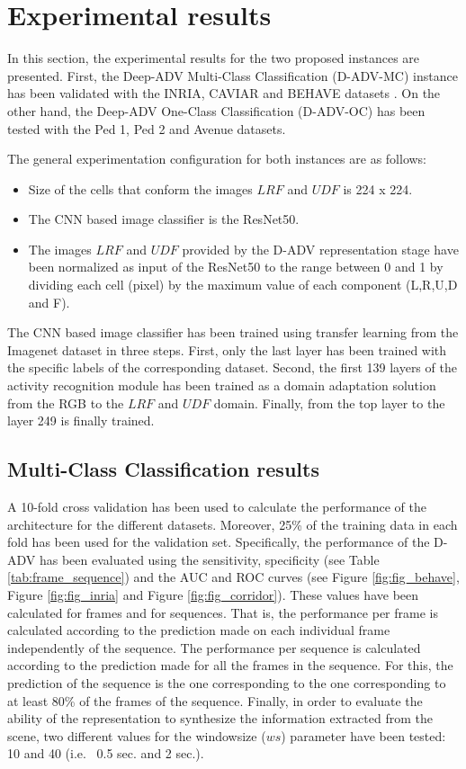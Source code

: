 \section{Experimental results} \label{sec:exp}\label{sec:gsetting}

In this section, the experimental results for the two proposed instances are presented. First, the Deep-ADV Multi-Class Classification (D-ADV-MC) instance has been validated with the INRIA, CAVIAR and BEHAVE datasets \cite{blunsden2010behave,fisher2004pets04}. On the other hand, the Deep-ADV One-Class Classification (D-ADV-OC) has been tested with the Ped 1, Ped 2 \cite{mahadevan2010anomaly} and Avenue \cite{lu2013abnormal} datasets. 

The general experimentation configuration for both instances are as follows:
\begin{itemize}
    \item Size of the cells that conform the images $LRF$ and $UDF$ is 224 x 224.
    \item The CNN based image classifier is the ResNet50. 
    \item The images $LRF$ and $UDF$ provided by the D-ADV representation stage have been normalized as input of the ResNet50 to the range between 0 and 1 by dividing each cell (pixel) by the maximum value of each component (L,R,U,D and F). 
\end{itemize}

The CNN based image classifier has been trained using transfer learning from the Imagenet dataset in three steps. First, only the last layer has been trained with the specific labels of the corresponding dataset. Second, the first 139 layers of the activity recognition module has been trained as a domain adaptation solution from the RGB to the $LRF$ and $UDF$ domain. Finally, from the top layer to the layer 249 is finally trained.
\subsection{Multi-Class Classification results}\label{sec:exp:mc}

A 10-fold cross validation has been used to calculate the performance of the architecture for the different datasets. Moreover, 25\% of the training data in each fold has been used for the validation set. Specifically, the performance of the D-ADV has been evaluated 
using the sensitivity, specificity (see Table \ref{tab:frame_sequence}) and the AUC and ROC curves (see Figure \ref{fig:fig_behave}, Figure \ref{fig:fig_inria} and Figure \ref{fig:fig_corridor}). These values have been calculated for frames and for sequences. That is, the performance per frame is calculated according to the prediction made on each individual frame independently of the sequence. The performance per sequence is calculated according to the prediction made for all the frames in the sequence. For this, the prediction of the sequence is the one corresponding to the one corresponding to at least 80\% of the frames of the sequence. Finally, in order to evaluate the ability of the representation to synthesize the information extracted from the scene, two different values for the windowsize ($ws$) parameter have been tested: 10 and 40 (i.e. ~0.5 sec. and 2 sec.).  

